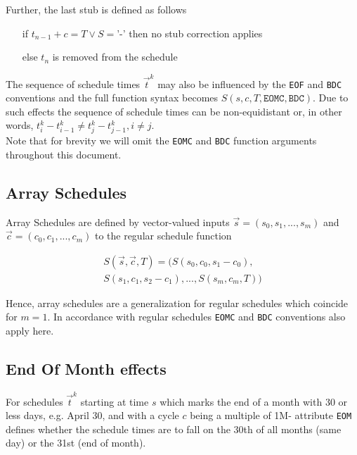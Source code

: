 \documentclass[9pt,oneside]{amsart}
\newcommand{\attr}[1]{\texttt{#1}}
\newcommand{\sdl}[3]{S(#1,#2,#3)}
\begin{document}
\begin{multicols}{2}
Further, the last stub is defined as follows

\begin{itemize}
	\item[if] $t_{n-1}+c=T \lor S=$'-' then no stub correction applies

	\item[else] $t_n$ is removed from the schedule
\end{itemize}

The sequence of schedule times $\vec{t}^k$ may also be influenced by the \attr{EOF} and \attr{BDC} conventions and the full function syntax becomes $\sdl{s}{c}{T, \attr{EOMC}, \attr{BDC}}$. Due to such effects the sequence of schedule times can be non-equidistant or, in other words, $t_i^k-t_{i-1}^k\neq t_j^k-t_{j-1}^k, i\neq j$.\\

Note that for brevity we will omit the \attr{EOMC} and \attr{BDC} function arguments throughout this document.


\subsection{Array Schedules}

Array Schedules are defined by vector-valued inputs $\vec{s}=(s_0,s_1,...,s_m)$ and $\vec{c}=(c_0,c_1,...,c_m)$ to the regular schedule function

\begin{multline*}
	\sdl{\vec{s}}{\vec{c}}{T} = (\sdl{s_0}{c_0}{s_1-c_0},\\
					\sdl{s_1}{c_1}{s_2-c_1},...,\sdl{s_m}{c_m}{T})
\end{multline*}


Hence, array schedules are a generalization for regular schedules which coincide for $m=1$. In accordance with regular schedules \attr{EOMC} and \attr{BDC} conventions also apply here.


\subsection{End Of Month effects}

For schedules $\vec{t}^k$ starting at time $s$ which marks the end of a month with 30 or less days, e.g. April 30, and with a cycle $c$ being a multiple of 1M- attribute \attr{EOM} defines whether the schedule times are to fall on the 30th of all months (same day) or the 31st (end of month).\\ 


\end{multicols}
\end{document}
